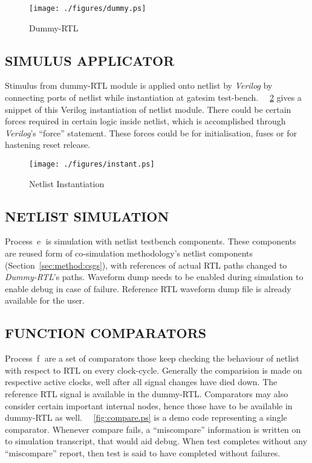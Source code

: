 \begin{figure}[h]
\centering
\texttt{[image: ./figures/dummy.ps]}
\caption{Dummy-RTL}
\label{fig:dummy.ps}
\end{figure}

\subsection{SIMULUS APPLICATOR}
Stimulus from dummy-RTL module is applied onto netlist by {\it Verilog} by connecting ports of netlist while instantiation at gatesim test-bench. ~\figurename{~\ref{fig:instant.ps}} gives a snippet of this Verilog instantiation of netlist module. There could be certain forces required in certain logic inside netlist, which is accomplished through {\it Verilog}'s ``force'' statement. These forces could be for initialisation, fuses or for hastening reset release.

\begin{figure}[h]
\centering
\texttt{[image: ./figures/instant.ps]}
\caption{Netlist Instantiation}
\label{fig:instant.ps}
\end{figure}

\subsection{NETLIST SIMULATION}
Process~\textcircled{e} is simulation with netlist testbench components. These components are reused form of co-simulation methodology's netlist components (Section~\ref{sec:method:csgs}), with references of actual RTL paths changed to {\it Dummy-RTL}'s paths. Waveform dump needs to be enabled during simulation to enable debug in case of failure. Reference RTL waveform dump file is already available for the user.

\subsection{FUNCTION COMPARATORS}
Process~\textcircled{f} are a set of comparators those keep checking the behaviour of netlist with respect to RTL on every clock-cycle. Generally the comparision is made on respective active clocks, well after all signal changes have died down. The reference RTL signal is available in the dummy-RTL. Comparators may also consider certain important internal nodes, hence those have to be available in dummy-RTL as well. ~\figurename{~\ref{fig:compare.ps}} is a demo code representing a single comparator. Whenever compare fails, a ``miscompare'' information is written on to simulation transcript, that would aid debug. When test completes without any ``miscompare'' report, then test is said to have completed without failures.

